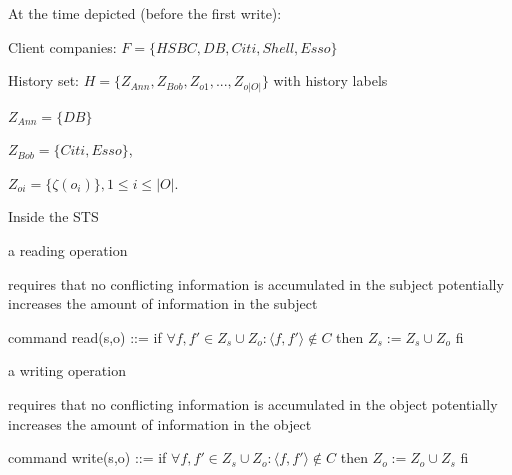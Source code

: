 \documentclass[a4paper]{article}
\begin{document}
\begin{multicols}{3}
    \begin{itemize*}
        \item At the time depicted (before the first write):
        \begin{itemize*}
            \item Client companies: $F=\{HSBC,DB,Citi,Shell,Esso\}$
            \item History set: $H=\{Z_{Ann},Z_{Bob},Z_{o1} ,...,Z_{o|O|}\}$ with history labels
            \begin{itemize*}
                \item $Z_{Ann}=\{DB\}$
                \item $Z_{Bob}=\{Citi,Esso\}$,
                \item $Z_{oi}=\{\zeta(o_i)\}, 1\leq i\leq |O|$.
            \end{itemize*}
        \end{itemize*}
    \end{itemize*}

    Inside the STS
    \begin{itemize*}
        \item a reading operation
        \begin{itemize*}
            \item requires that no conflicting information is accumulated in the subject potentially increases the amount of information in the subject
            \item command read(s,o) ::= if $\forall f,f'\in Z_s \cup Z_o:⟨f,f'⟩\not\in C$ then $Z_s:=Z_s\cup Z_o$ fi
        \end{itemize*}
        \item a writing operation
        \begin{itemize*}
            \item requires that no conflicting information is accumulated in the object potentially increases the amount of information in the object
            \item command write(s,o) ::= if $\forall f,f'\in Z_s\cup Z_o:⟨f,f'⟩\not\in C$ then $Z_o:=Z_o\cup Z_s$ fi
        \end{itemize*}
    \end{itemize*}


\end{multicols}
\end{document}

